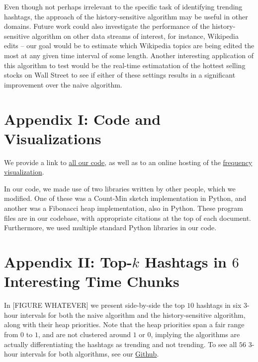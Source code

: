 \documentclass[twoside]{article}
\begin{document}
Even though not perhaps irrelevant to the specific task of identifying trending hashtags, 
the approach of the history-sensitive algorithm may be useful in other domains.
Future work could also investigate the performance of the history-sensitive algorithm on other data streams of interest, for instance, Wikipedia edits -- our goal would be to estimate which Wikipedia topics are being edited the most at any given time interval of some length. Another interesting application of this algorithm to test would be the real-time estimatation of the hottest selling stocks on Wall Street to see if either of these settings results in a significant improvement over the naive algorithm.

\section{Appendix I: Code and Visualizations} \label{sec:Appendix_code_viz}

We provide a link to \href{https://github.com/kiranvodrahalli/cos521/}{all our code}, as well as to an online hosting of the \href{http://www.princeton.edu/~awlee/trends.html}{frequency visualization}.

In our code, we made use of two libraries written by other people, which we modified. One of these was a Count-Min sketch implementation in Python, and another was a Fibonacci heap implementation, also in Python. These program files are in our codebase, with appropriate citations at the top of each document. Furthermore, we used multiple standard Python libraries in our code.

\section{Appendix II: Top-$k$ Hashtags in $6$ Interesting Time Chunks} \label{sec:Appendix_topk}

In [FIGURE WHATEVER] we present side-by-side the top $10$ hashtags in six $3$-hour intervals for both the naive algorithm and the history-sensitive algorithm, along with their heap priorities. Note that the heap priorities span
a fair range from $0$ to $1$, and are not clustered around $1$ or $0$, implying the algorithms are actually differentiating the hashtags as trending and not trending. To see all $56$ $3$-hour intervals for both algorithms, see our \href{https://github.com/kiranvodrahalli/cos521/}{Github}.

\newpage
\end{document}
